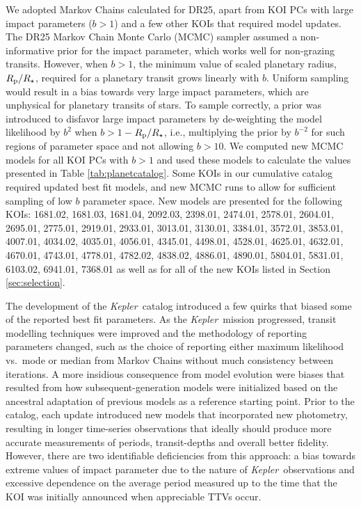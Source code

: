 \documentclass{aastex62}
\newcommand{\ik}{{\it Kepler~}}
\newcommand{\rprs}{\ensuremath{R_{\rm p}/R_\star}}
\begin{document}
We adopted Markov Chains calculated for DR25, apart from KOI PCs with large impact parameters ($b > 1$) and a few other KOIs that required model updates.  The DR25 Markov Chain Monte Carlo (MCMC) sampler assumed a non-informative prior for the impact parameter, which works well for non-grazing transits.  However, when $b > 1$, the minimum value of scaled planetary radius, \rprs, required for a planetary transit grows linearly with $b$.   Uniform sampling would result in a bias towards very large impact parameters, which are unphysical for planetary transits of stars.  To sample correctly, a prior was introduced to disfavor large impact parameters by de-weighting the model likelihood by $b^2$ when $b > 1-$\rprs, i.e., multiplying the prior by $b^{-2}$ for such regions of parameter space and not allowing $b>10$.  We computed new MCMC models for all KOI PCs with $b > 1$  and used these models to calculate the values presented in Table \ref{tab:planetcatalog}.  Some KOIs in our cumulative catalog required updated best fit models, and new MCMC runs to allow for sufficient sampling of low $b$ parameter space.  New models are presented for the following KOIs: 1681.02, 1681.03, 1681.04, 2092.03, 2398.01, 2474.01, 2578.01, 2604.01, 2695.01, 2775.01, 2919.01, 2933.01, 3013.01, 3130.01, 3384.01, 3572.01, 3853.01, 4007.01, 4034.02, 4035.01, 4056.01, 4345.01, 4498.01, 4528.01, 4625.01, 4632.01, 4670.01, 4743.01, 4778.01, 4782.02, 4838.02, 4886.01, 4890.01, 5804.01, 5831.01, 6103.02, 6941.01, 7368.01 as well as for all of the new KOIs listed in Section \ref{sec:selection}.

The development of the \ik catalog introduced a few quirks that biased some of the reported best fit parameters. As the \ik mission progressed, transit modelling techniques were improved and the methodology of reporting parameters changed, such as the choice of reporting either maximum likelihood vs.~mode or median from Markov Chains without much consistency between iterations.  A more insidious consequence from model evolution were biases that resulted from how subsequent-generation models were initialized based on the ancestral adaptation of previous models as a reference starting point.  Prior to the \cite{Mullally:2015} catalog, each update introduced new models that incorporated new photometry, resulting in longer time-series observations that ideally should produce more accurate measurements of periods, transit-depths and overall better fidelity.  However, there are two identifiable deficiencies from this approach: a bias towards extreme values of impact parameter due to the nature of \ik observations and excessive dependence on the average period measured up to the time that the KOI was initially announced when appreciable TTVs occur.
\end{document}
